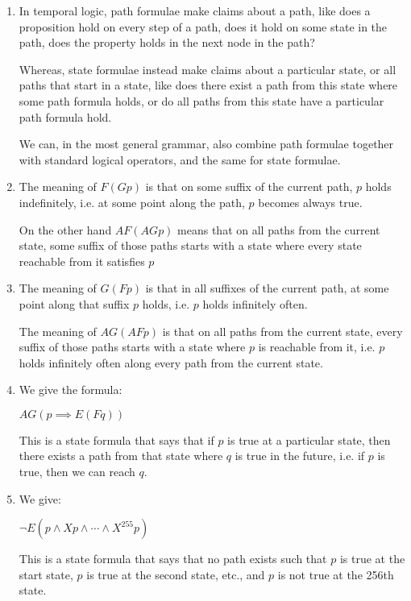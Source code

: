 


\begin{enumerate}[label=(\alph*)]

  \item
    In temporal logic, path formulae make claims about a path, like does a proposition hold on every step of a path, does it hold on some state in the path, does the property holds in the  next node in the path?

    Whereas, state formulae instead make claims about a particular state, or all paths that start in a state, like does there exist a path from this state where some path formula holds, or do all paths from this state have a particular path formula hold.

    We can, in the most general grammar, also combine path formulae together with standard logical operators, and the same for state formulae.

    \item
      The meaning of $F( G p)$ is that on some suffix of the current path, $p$ holds indefinitely, i.e. at some point along the path, $p$ becomes always true.

      On the other hand $AF(AG p)$ means that on all paths from the current state, some suffix of those paths starts with a state where every state reachable from it satisfies $p$

      \item
        The meaning of $G( F p)$ is that in all suffixes of the current path, at some point along that suffix $p$ holds, i.e. $p$ holds infinitely often.

        The meaning of $AG(AF p)$ is that on all paths from the current state, every suffix of those paths starts with a state where $p$ is reachable from it, i.e. $p$ holds infinitely often along every path from the current state.

        \item

          We give the formula:

          $AG (p \implies E (F q))$

          This is a state formula that says that if $p$ is true at a particular state, then there exists a path from that state where $q$ is true in the future, i.e. if $p$ is true, then we can reach $q$.

          \item
            We give:

            $\neg E (p \wedge X p \wedge \cdots \wedge X^{255} p)$

            This is a state formula that says that no path exists such that $p$ is true at the start state, $p$ is true at the second state, etc., and $p$ is not true at the 256th state.
        
    \end{enumerate}

